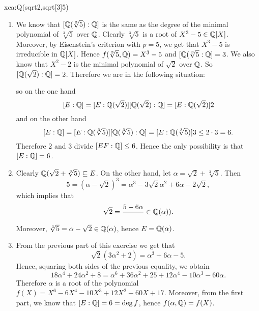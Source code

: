 \begin{sol}{xca:Q(sqrt2,sqrt[3]5)}\
    \begin{enumerate}
        \item      
        We know that $[\mathbb{Q}(\sqrt[3]{5}):\mathbb{Q}]$ is the same as
    the degree of the minimal polynomial of $\sqrt[3]{5}$
    over $\mathbb{Q}$.
    Clearly $\sqrt[3]{5}$ is a root of $X^3-5\in\mathbb{Q}[X]$.
    Moreover, by Eisenstein's criterion with
    $p=5$, we get that $X^3-5$ is irreducible in $\mathbb{Q}[X]$.
    Hence $f(\sqrt[3]{5},\mathbb{Q})=X^3-5$ and $[\mathbb{Q}(\sqrt[3]{5}:\mathbb{Q}]=3$.
    We also know that $X^2-2$ is the minimal polynomial of $\sqrt{2}$ over $\mathbb{Q}$. 
    So $[\mathbb{Q}(\sqrt{2}):\mathbb{Q}]=2$.
    Therefore we are in the following situation:
    \
    \begin{center}
    \end{center}
    so on the one hand
    \[
    [E:\mathbb{Q}]=[E:\mathbb{Q}(\sqrt{2})][\mathbb{Q}(\sqrt{2}):\mathbb{Q}]=[E:\mathbb{Q}(\sqrt{2})]2
    \]
    and on the other hand
    \[
    [E:\mathbb{Q}]=[E:\mathbb{Q}(\sqrt[3]{5})][\mathbb{Q}(\sqrt[3]{5}):\mathbb{Q}]=[E:\mathbb{Q}(\sqrt[3]{5})]3\leq 2\cdot 3=6.
    \]
    Therefore $2$ and $3$ divide $[EF:\mathbb{Q}]\leq 6$.
    Hence the only possibility is that $[E:\mathbb{Q}]=6$.
    \item Clearly $\mathbb{Q}(\sqrt{2}+\sqrt[3]{5})\subseteq E$.
    On the other hand, let $\alpha=\sqrt{2}+\sqrt[3]{5}$.
    Then 
    \[
    5=(\alpha-\sqrt{2})^3=\alpha^3-3\sqrt{2}\alpha^2+6\alpha-2\sqrt{2},
    \]
    which implies that 
    \[
    \sqrt{2}=\frac{5-6\alpha}{}\in\mathbb{Q}(\alpha)).
    \]
    Moreover, $\sqrt[3]{5}=\alpha-\sqrt{2}\in\mathbb{Q}(\alpha)$, hence $E=\mathbb{Q}(\alpha)$.
    \item From the previous part of this exercise
    we get that 
    \[
    \sqrt{2}(3\alpha^2+2)=\alpha^3+6\alpha-5.
    \]
    Hence, squaring both sides of the previous equality,
    we obtain
    \[
    18\alpha^4+24\alpha^2+8=\alpha^6+36\alpha^2+25+12\alpha^4-10\alpha^3-60\alpha.
    \]
    Therefore $\alpha$ is a root of the 
    polynomial $f(X)=X^6-6X^4-10X^3+12X^2-60X+17$.
    Moreover, from the first part, we know that
    $[E:\mathbb{Q}]=6=\deg f$, hence $f(\alpha,\mathbb{Q})=f(X)$.
    \end{enumerate}
\end{sol}


